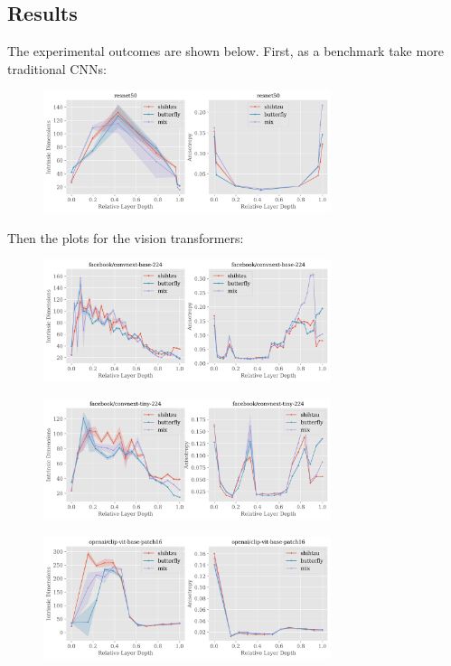\documentclass[
  11pt,
  a4paper,
  onecolumn]{article}
\begin{document}
\subsection{Results}

The experimental outcomes are shown below. First, as a benchmark take more traditional CNNs:
\begin{figure}[h!]
\centering
\includegraphics[width=0.75\textwidth]{figures/resnet50_topology.png}
\end{figure}

Then the plots for the vision transformers:
\begin{figure}[h!]
\centering
\includegraphics[width=0.75\textwidth]{figures/facebook-convnext-base-224_topology.png}
\end{figure}

\begin{figure}[h!]
\centering
\includegraphics[width=0.75\textwidth]{figures/facebook-convnext-tiny-224_topology.png}
\end{figure}

\begin{figure}[h!]
\centering
\includegraphics[width=0.75\textwidth]{figures/openai-clip-vit-base-patch16_topology.png}
\end{figure}
\end{document}
